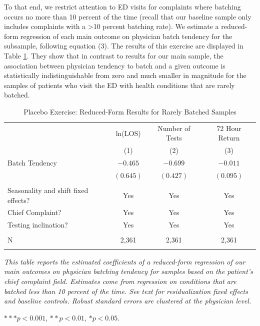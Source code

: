 \documentclass[,,nonblindrev]{informs}
\begin{document}
To that end, we restrict attention to ED visits for complaints where
batching occurs no more than 10 percent of the time (recall that our
baseline sample only includes complaints with a \textgreater10 percent
batching rate). We estimate a reduced-form regression of each main
outcome on physician batch tendency for the subsample, following
equation (3). The results of this exercise are displayed in Table
\ref{tab:placebo_check}. They show that in contrast to results for our
main sample, the association between physician tendency to batch and a
given outcome is statistically indistinguishable from zero and much
smaller in magnitude for the samples of patients who visit the ED with
health conditions that are rarely batched.

\begin{table}[htbp]
\centering
\caption{Placebo Exercise: Reduced-Form Results for Rarely Batched Samples}
\label{tab:placebo_check}
\begin{tabular}{p{8cm}ccc}
\toprule
& ln(LOS) & Number of Tests & 72 Hour Return \\ 
& (1) & (2) & (3) \\
\midrule
Batch Tendency & $-0.465$ & $-0.699$ & $-0.011$ \\
& $(0.645)$ & $(0.427)$ & $(0.095)$ \\
                    &     &     &  \\
Seasonality and shift fixed effects? & Yes & Yes & Yes \\
Chief Complaint? & Yes & Yes & Yes \\
Testing inclination? & Yes & Yes & Yes \\
                    &     &     &  \\
N & 2,361 & 2,361 & 2,361 \\
\addlinespace
\midrule
\bottomrule
\end{tabular}
\begin{tablenotes}
\small
\item \textit{This table reports the estimated coefficients of a reduced-form regression of our main outcomes on physician batching tendency for samples based on the patient’s chief complaint field. Estimates come from regression on conditions that are batched less than 10 percent of the time. See text for residualization fixed effects and baseline controls. Robust standard errors are clustered at the physician level.}
\item $*** p < 0.001$, $** p < 0.01$, $* p < 0.05$.
\end{tablenotes}
\end{table}
\end{document}
